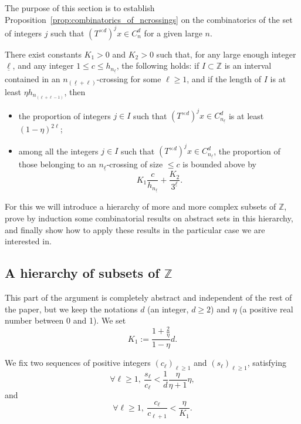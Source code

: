 \documentclass[AHL,Unicode,longabstracts]{cedram}
\newcommand{\egdef}{:=}
\newcommand{\ZZ}{\mathbb{Z}}
\newcommand{\cd}{C^{d}}
\newcommand{\td}{T^{\times d}}
\newcommand{\lb}{\underline{\ell}}
\let\oldforall\forall
\renewcommand*{\forall}{\mathrel{\oldforall}}
\begin{document}
The purpose of this section is to establish Proposition~\ref{prop:combinatorics_of_ncrossings} on the combinatorics of the set of integers $j$ such that $(\td)^j x\in \cd_n$ for a given large $n$.

\begin{prop}\label{prop:combinatorics_of_ncrossings}
There exist constants $K_1>0$ and $K_2>0$ such that, for any large enough integer $\lb$, and any integer $1\le c\le h_{n_{\lb}}$, the following holds: if $I\subset \ZZ$ is an interval contained in an $n_{(\lb+\ell)}$-crossing for some $\ell\ge1$, and if the length of $I$ is at least $\eta h_{n_{(\lb+\ell-1)}}$, then
\begin{itemize}
\item the proportion of integers $j\in I$ such that $(\td)^jx\in\cd_{n_{\lb}}$ is at least $(1-\eta)^{2\ell}$;
\item among all the integers $j\in I$ such that $(\td)^jx\in\cd_{n_{\lb}}$, the proportion of those belonging to an $n_{\lb}$-crossing of size $\le c$ is
bounded above by
\[
K_1 \frac{c}{h_{n_{\lb}}} + \frac{K_2}{3^{\lb}}.
\]
\end{itemize}
\end{prop}

For this we will introduce a hierarchy of more and more complex subsets of $\ZZ$, prove by induction some combinatorial results on abstract sets in this hierarchy, and finally show how to apply these results in the particular case we are interested in.

\subsection{A hierarchy of subsets of \texorpdfstring{$\ZZ$}{Z}}\label{sec:hierarchy}

This part of the argument is completely abstract and independent of the rest of the paper, but we keep the notations $d$ (an integer, $d\ge2$) and $\eta$ (a positive real number between 0 and 1). We set
\[
K_1\egdef \dfrac{1+\frac{2}{\eta}}{1-\eta}d.
\]

We fix two sequences of positive integers $\left(c_\ell\right)_{\ell\ge1}$ and $\left(s_\ell\right)_{\ell\ge1}$, satisfying
\begin{equation}\label{eq:cs_cond1}
\forall \ell\ge1,\ \frac{s_\ell}{c_\ell}<\frac{1}{d}\frac{\eta}{\eta+1}\eta,
\end{equation}
and
\begin{equation}\label{eq:cs_cond2}
\forall \ell\ge1,\ \frac{c_\ell}{c_{\ell+1}}<\frac{\eta}{K_1}.
\end{equation}
\end{document}

